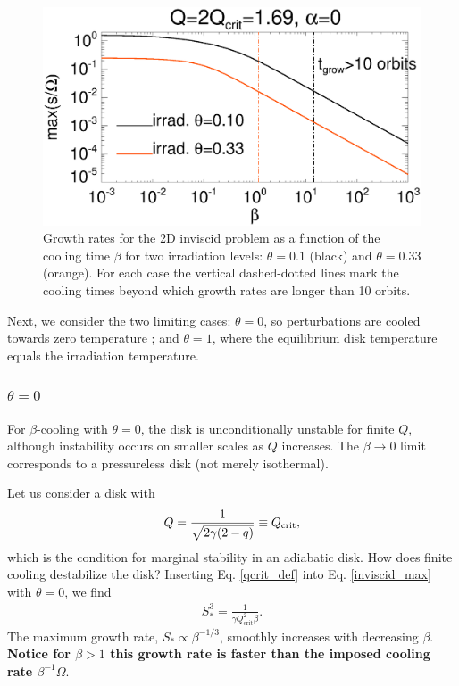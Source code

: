 \begin{figure}
  \includegraphics[width=\linewidth,clip=true,trim=0cm 0cm 0cm
    0.0cm]{figures/2dinvisc_theta}
  \caption{
    Growth rates for the 2D inviscid problem as a function of
    the cooling time $\beta$ for two irradiation levels: $\theta=0.1$ (black) and
    $\theta=0.33$ (orange). For each case the vertical dashed-dotted
    lines mark the cooling times beyond which 
    growth rates are longer than 10 orbits. 
    \label{invisc_theta}}
\end{figure}



Next, we consider the two limiting cases: $\theta=0$, so perturbations are
cooled towards zero temperature \citep[typically employed in
numerical simulations, e.g.][]{gammie01}; and $\theta=1$, where the
equilibrium disk temperature equals the irradiation temperature.  






\subsubsection{$\theta = 0$}\label{theta0}
For $\beta$-cooling with $\theta=0$, the disk is unconditionally
unstable for finite $Q$, although instability occurs on smaller scales
as $Q$ increases.  The $\beta\to0$ limit corresponds to a 
pressureless disk (not merely isothermal).   

Let us consider a disk with 
\begin{align}\label{qcrit_def}
  Q = \frac{1}{\sqrt{2\gamma(2-q)}}\equiv Q_{\mathrm{crit}},
\end{align} 
which is the condition for marginal stability in an adiabatic disk. 
How does finite cooling destabilize the disk?  
Inserting Eq. \ref{qcrit_def} into Eq. \ref{inviscid_max} with 
$\theta=0$, we find 
\begin{align}\label{sstar}
  S_*^3 = \frac{1}{\gamma Q_\mathrm{crit}^2 \beta}. 
\end{align}
The maximum growth rate, $S_*\propto \beta^{-1/3}$, smoothly
increases with decreasing $\beta$. {\bf Notice for $\beta>1$ this growth
  rate is faster than the imposed cooling rate $\beta^{-1}\Omega$}.

